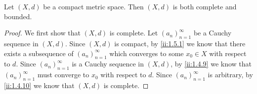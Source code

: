 \begin{prop}\label{ii:1.5.5}
  Let \((X, d)\) be a compact metric space.
  Then \((X, d)\) is both complete and bounded.
\end{prop}

\begin{proof}
  We first show that \((X, d)\) is complete.
  Let \((a_n)_{n = 1}^\infty\) be a Cauchy sequence in \((X, d)\).
  Since \((X, d)\) is compact, by \cref{ii:1.5.1} we know that there exists a subsequence of \((a_n)_{n = 1}^\infty\) which converges to some \(x_0 \in X\) with respect to \(d\).
  Since \((a_n)_{n = 1}^\infty\) is a Cauchy sequence in \((X, d)\), by \cref{ii:1.4.9} we know that \((a_n)_{n = 1}^\infty\) must converge to \(x_0\) with respect to \(d\).
  Since \((a_n)_{n = 1}^\infty\) is arbitrary, by \cref{ii:1.4.10} we know that \((X, d)\) is complete.


\end{proof}
